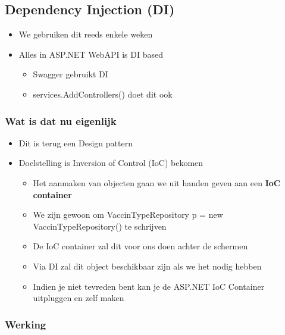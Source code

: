 \documentclass{article}
\begin{document}
\subsection{Dependency Injection (DI)}

\begin{itemize}
    \item We gebruiken dit reeds enkele weken
    \item Alles in ASP.NET WebAPI is DI based
    \begin{itemize}
        \item Swagger gebruikt DI
        \item services.AddControllers() doet dit ook
    \end{itemize}
\end{itemize}

\subsubsection{Wat is dat nu eigenlijk}

\begin{itemize}
    \item Dit is terug een Design pattern
    \item Doelstelling is Inversion of Control (IoC) bekomen
    \begin{itemize}
        \item Het aanmaken van objecten gaan we uit handen geven aan een \textbf{IoC container}
        \item We zijn gewoon om VaccinTypeRepository p = new VaccinTypeRepository() te schrijven
        \item De IoC container zal dit voor ons doen achter de schermen
        \item Via DI zal dit object beschikbaar zijn als we het nodig hebben
        \item Indien je niet tevreden bent kan je de ASP.NET IoC Container uitpluggen en zelf maken
    \end{itemize}
\end{itemize}

\subsubsection{Werking}
\end{document}
